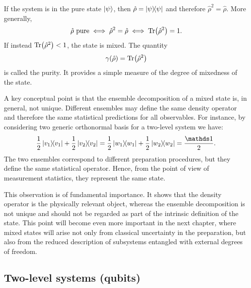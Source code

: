If the system is in the pure state $\ket{\psi}$, then $\hat \rho=\dyad{\psi}{\psi}$ and therefore $\hat \rho^2=\hat \rho$. More generally,
\begin{equation}
	\hat \rho \ \text{pure}
	\iff
	\hat \rho^2=\hat \rho
	\iff
	\Tr(\hat \rho^2)=1.
	\label{eq:intro_qm_pure_state_characterization}
\end{equation}
If instead $\Tr(\hat \rho^2)<1$, the state is mixed. The quantity
\begin{equation}
	\gamma(\hat \rho)=\Tr(\hat \rho^2)
	\label{eq:intro_qm_purity_definition}
\end{equation}
is called the purity. It provides a simple measure of the degree of mixedness of the state.

A key conceptual point is that the ensemble decomposition of a mixed state is, in general, not unique. Different ensembles may define the same density operator and therefore the same statistical predictions for all observables. For instance, by considering two generic orthonormal basis for a two-level system we have:
\begin{equation}
	\frac{1}{2}\dyad{v_1}{v_1}+\frac{1}{2}\dyad{v_2}{v_2}
	=
	\frac{1}{2}\dyad{w_1}{w_1}+\frac{1}{2}\dyad{w_2}{w_2}
	=
	\frac{\id}{2}.
	\label{eq:intro_qm_nonuniqueness_ensemble_decomposition}
\end{equation}
The two ensembles correspond to different preparation procedures, but they define the same statistical operator. Hence, from the point of view of measurement statistics, they represent the same state.

This observation is of fundamental importance. It shows that the density operator is the physically relevant object, whereas the ensemble decomposition is not unique and should not be regarded as part of the intrinsic definition of the state. This point will become even more important in the next chapter, where mixed states will arise not only from classical uncertainty in the preparation, but also from the reduced description of subsystems entangled with external degrees of freedom.

\subsection{Two-level systems (qubits)}
\label{subsec:two_level_systems_and_preferred_bases}

